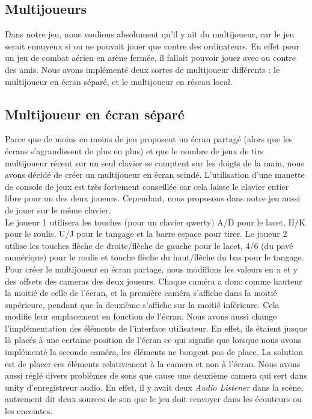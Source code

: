 \documentclass[12pt, titlepage]{article}
\begin{document}
\begin{spacing}{1.5}
\newpage
\section{Multijoueurs}

Dans notre jeu, nous voulions absolument qu'il y ait du multijoueur, car le jeu serait ennuyeux si on ne pouvait jouer que contre des ordinateurs. En effet pour un jeu de combat aérien en arène fermée, il fallait pouvoir jouer avec ou contre des amis. Nous avons implémenté deux sortes de multijoueur différents : le multijoueur en écran séparé, et le multijoueur en réseau local.\\

\subsection{Multijoueur en écran séparé}

Parce que de moins en moins de jeu proposent un écran partagé (alors que les écrans s'agrandissent de plus en plus) et que le nombre de jeux de tirs multijoueur récent sur un seul clavier se comptent sur les doigts de la main, nous avons décidé de créer un multijoueur en écran scindé. L'utilisation d'une manette de console de jeux est très fortement conseillée car cela laisse le clavier entier libre pour un des deux joueurs. Cependant, nous proposons dans notre jeu aussi de jouer sur le même clavier.\\

 Le joueur 1 utilisera les touches (pour un clavier qwerty) A/D pour le lacet, H/K pour le roulis, U/J pour le tangage et la barre espace pour tirer. Le joueur 2 utilise les touches flèche de droite/flèche de gauche pour le lacet, 4/6 (du pavé numérique) pour le roulis et touche flèche du haut/flèche du bas pour le tangage.\\

Pour créer le multijoueur en écran partage, nous modifions les valeurs en x et y des offsets des cameras des deux joueurs. Chaque caméra a donc comme hauteur la moitié de celle de l'écran, et la première caméra s'affiche dans la moitié supérieure, pendant que la deuxième s'affiche sur la moitié inférieure. Cela modifie leur emplacement en fonction de l'écran. Nous avons aussi change l'implémentation des éléments de l'interface utilisateur. En effet, ils étaient jusque là placés à une certaine position de l'écran ce qui signifie que lorsque nous avons implémenté la seconde caméra, les éléments ne bougent pas de place. La solution est de placer ces éléments relativement à la camera et non à l'écran. Nous avons aussi réglé divers problèmes de sons que cause une deuxième camera qui sert dans unity d'enregistreur audio. En effet, il y avait deux \textit{Audio Listener} dans la scène, autrement dit deux sources de son que le jeu doit renvoyer dans les écouteurs ou les enceintes.\\


\end{spacing}
\end{document}
